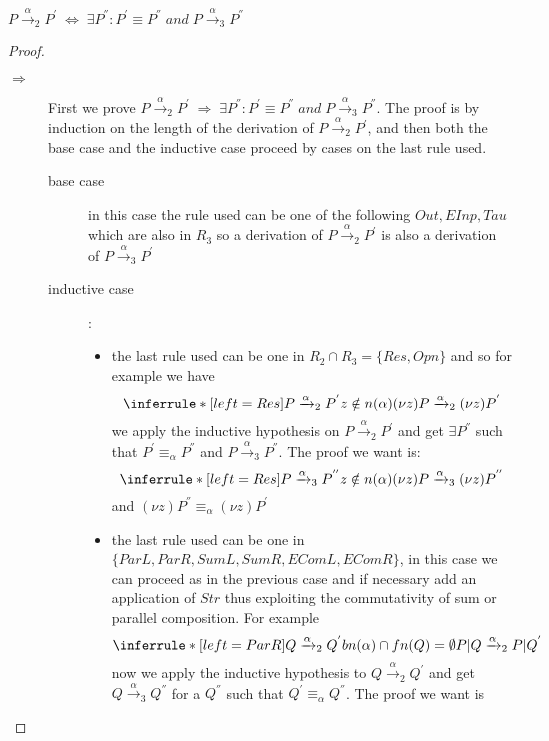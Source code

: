 \begin{theorem}
  $P\xrightarrow{\alpha}_{2}P^{'}\; \Leftrightarrow\; \exists P^{''}: P^{'}\equiv P^{''}\; and\; P\xrightarrow{\alpha}_{3}P^{''}$
  \begin{proof}
    \begin{description}
      \item[$\Rightarrow$] 
	First we prove $P\xrightarrow{\alpha}_{2}P^{'}\; \Rightarrow\; \exists P^{''}: P^{'}\equiv P^{''}\; and\; P\xrightarrow{\alpha}_{3}P^{''}$. The proof is by induction on the length of the derivation of $P\xrightarrow{\alpha}_{2}P^{'}$, and then both the base case and the inductive case proceed by cases on the last rule used.
	\begin{description}
	  \item[base case]
	    in this case the rule used can be one of the following $Out, EInp, Tau$ which are also in $R_{3}$ so a derivation of $P\xrightarrow{\alpha}_{2}P^{'}$ is also a derivation of $P\xrightarrow{\alpha}_{3}P^{'}$
	  \item[inductive case]:
	    \begin{itemize}
	      \item 
		the last rule used can be one in $R_{2}\cap R_{3}=\{Res, Opn\}$ and so for example we have 
		\[
		  \inferrule* [left=Res]{
		      P\xrightarrow{\alpha}_{2} P^{'}
		    \\
		      z\notin n(\alpha)
		  }{
		    (\nu z) P\xrightarrow{\alpha}_{2}(\nu z) P^{'}
		  }
		\]
		we apply the inductive hypothesis on $P\xrightarrow{\alpha}_{2} P^{'}$ and get $\exists P^{''}$ such that $P^{'}\equiv_{\alpha}P^{''}$ and $P\xrightarrow{\alpha}_{3} P^{''}$. The proof we want is:
		\[
		  \inferrule* [left=Res]{
		      P\xrightarrow{\alpha}_{3} P^{''}
		    \\
		      z\notin n(\alpha)
		  }{
		    (\nu z) P\xrightarrow{\alpha}_{3}(\nu z) P^{''}
		  }
		\]
		and $(\nu z) P^{''}\equiv_{\alpha}(\nu z) P^{'}$
	      \item
		the last rule used can be one in $\{ParL, ParR, SumL, SumR, EComL, EComR\}$, in this case we can proceed as in the previous case and if necessary add an application of $Str$ thus exploiting the commutativity of sum or parallel composition. For example
		\[
		  \inferrule* [left=ParR]{
		      Q\xrightarrow{\alpha}_{2}Q^{'}
		    \\
		      bn(\alpha)\cap fn(Q)=\emptyset
		  }{
		      P|Q\xrightarrow{\alpha}_{2}P|Q^{'}
		  }
		\]	
		now we apply the inductive hypothesis to $Q\xrightarrow{\alpha}_{2}Q^{'}$ and get $Q\xrightarrow{\alpha}_{3}Q^{''}$ for a $Q^{''}$ such that $Q^{'}\equiv_{\alpha} Q^{''}$. The proof we want is

\end{itemize}
\end{description}
\end{description}
\end{proof}
\end{theorem}
